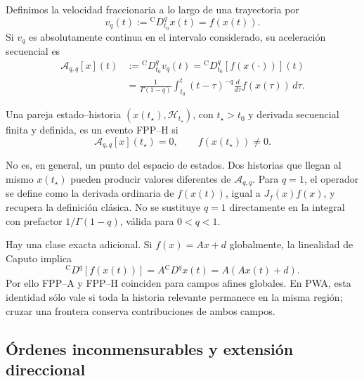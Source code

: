 Definimos la velocidad fraccionaria a lo largo de una trayectoria por
\begin{equation}
 v_q(t):={}^{\mathrm C}D_{t_0}^qx(t)=f(x(t)).
\end{equation}
Si \(v_q\) es absolutamente continua en el intervalo considerado, su
aceleración secuencial es
\begin{align}
 \mathcal A_{q,q}[x](t)
 &:={}^{\mathrm C}D_{t_0}^qv_q(t)
 ={}^{\mathrm C}D_{t_0}^q[f(x(\cdot))](t)
 \label{eq:fpph-sequential-definition}\\
 &=\frac1{\Gamma(1-q)}
 \int_{t_0}^{t}(t-\tau)^{-q}
 \frac{d}{d\tau}f(x(\tau))\,d\tau.
 \label{eq:fpph-history-integral}
\end{align}

\begin{definition}
Una pareja estado--historia \((x(t_\star),\mathcal H_{t_\star})\), con
\(t_\star>t_0\) y derivada secuencial finita y definida, es un evento
FPP--H si
\begin{equation}
 \mathcal A_{q,q}[x](t_\star)=0,
 \qquad f(x(t_\star))\neq0.
 \label{eq:fpph-event}
\end{equation}
\end{definition}

No es, en general, un punto del espacio de estados. Dos historias que llegan
al mismo \(x(t_\star)\) pueden producir valores diferentes de
\(\mathcal A_{q,q}\). Para \(q=1\), el operador se define como la
derivada ordinaria de \(f(x(t))\), igual a \(J_f(x)f(x)\), y recupera
la definición clásica. No se sustituye \(q=1\) directamente en la
integral con prefactor \(1/\Gamma(1-q)\), válida para \(0<q<1\).

Hay una clase exacta adicional. Si \(f(x)=Ax+d\) globalmente, la linealidad de
Caputo implica
\begin{equation}
 {}^{\mathrm C}D^q[f(x(t))]
 =A{}^{\mathrm C}D^qx(t)=A(Ax(t)+d).
 \label{eq:pp-affine-exact-caputo}
\end{equation}
Por ello FPP--A y FPP--H coinciden para campos afines globales. En PWA, esta
identidad sólo vale si toda la historia relevante permanece en la misma
región; cruzar una frontera conserva contribuciones de ambos campos.

\subsection{Órdenes inconmensurables y extensión direccional}

